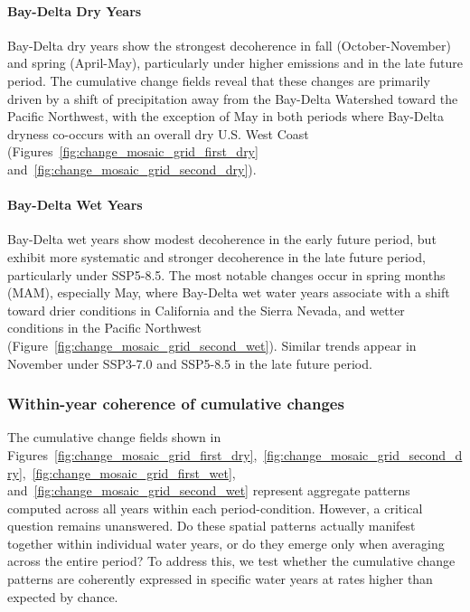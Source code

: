 \paragraph*{Bay-Delta Dry Years}
Bay-Delta dry years show the strongest decoherence in fall (October-November) and spring (April-May), particularly under higher emissions and in the late future period.
%
The cumulative change fields reveal that these changes are primarily driven by a shift of precipitation away from the Bay-Delta Watershed toward the Pacific Northwest, with the exception of May in both periods where Bay-Delta dryness co-occurs with an overall dry U.S. West Coast (Figures~\ref{fig:change_mosaic_grid_first_dry} and~\ref{fig:change_mosaic_grid_second_dry}).

\paragraph*{Bay-Delta Wet Years}
Bay-Delta wet years show modest decoherence in the early future period, but exhibit more systematic and stronger decoherence in the late future period, particularly under SSP5-8.5.
%
The most notable changes occur in spring months (MAM), especially May, where Bay-Delta wet water years associate with a shift toward drier conditions in California and the Sierra Nevada, and wetter conditions in the Pacific Northwest (Figure~\ref{fig:change_mosaic_grid_second_wet}).
%
%
Similar trends appear in November under SSP3-7.0 and SSP5-8.5 in the late future period.


\subsubsection{Within-year coherence of cumulative changes}
The cumulative change fields shown in Figures~\ref{fig:change_mosaic_grid_first_dry},~\ref{fig:change_mosaic_grid_second_dry},~\ref{fig:change_mosaic_grid_first_wet}, and~\ref{fig:change_mosaic_grid_second_wet} represent aggregate patterns computed across all years within each period-condition.
%
However, a critical question remains unanswered. 
%
Do these spatial patterns actually manifest together within individual water years, or do they emerge only when averaging across the entire period?
%
To address this, we test whether the cumulative change patterns are coherently expressed in specific water years at rates higher than expected by chance.

